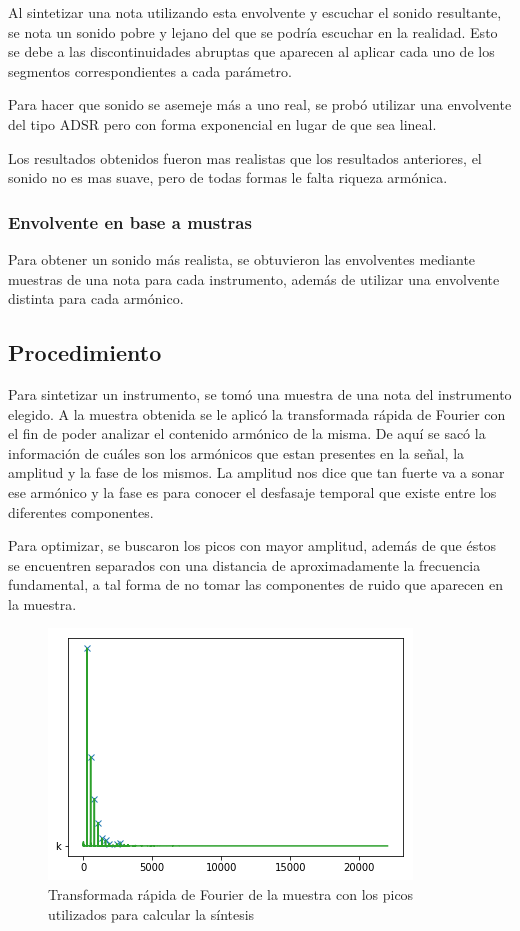 \documentclass[assd_tp2_main.tex]{subfiles}
\begin{document}
Al sintetizar una nota utilizando esta envolvente y escuchar el sonido resultante, se nota un sonido pobre y lejano del que se podría escuchar en la realidad. Esto se debe a las discontinuidades abruptas que aparecen al aplicar cada uno de los segmentos correspondientes a cada parámetro.

Para hacer que sonido se asemeje más a uno real, se probó utilizar una envolvente del tipo ADSR pero con forma exponencial en lugar de que sea lineal.

Los resultados obtenidos fueron mas realistas que los resultados anteriores, el sonido no es mas suave, pero de todas formas le falta riqueza armónica.

\subsubsection{Envolvente en base a mustras}

Para obtener un sonido más realista, se obtuvieron las envolventes mediante muestras de una nota para cada instrumento, además de utilizar una envolvente distinta para cada armónico.


\subsection{Procedimiento}

Para sintetizar un instrumento, se tomó una muestra de una nota del instrumento elegido. A la muestra obtenida se le aplic\'o la transformada r\'apida de Fourier con el fin de poder analizar el contenido arm\'onico de la misma. De aqu\'i se sac\'o la informaci\'on de cu\'ales son los arm\'onicos que estan presentes en la señal, la amplitud y la fase de los mismos. La amplitud nos dice que tan fuerte va a sonar ese armónico y la fase es para conocer el desfasaje temporal que existe entre los diferentes componentes.

Para optimizar, se buscaron los picos con mayor amplitud, además de que éstos se encuentren separados con una distancia de aproximadamente la frecuencia fundamental, a tal forma de no tomar las componentes de ruido que aparecen en la muestra.

\begin{figure}[H]
	\centering
	\includegraphics[scale=0.75]{graficos/fft.png}
	\caption{Transformada rápida de Fourier de la muestra con los picos utilizados para calcular la síntesis}
\end{figure}
\end{document}
